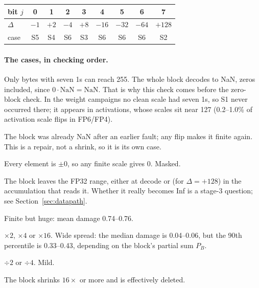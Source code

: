 \documentclass[10pt,a4paper]{article}
\begin{document}
\begin{center}
\begin{tabular}{lcccccccc}
\toprule
bit $j$ & 0 & 1 & 2 & 3 & 4 & 5 & 6 & 7 \\
\midrule
$\Delta$ & $-1$ & $+2$ & $-4$ & $+8$ & $-16$ & $-32$ & $-64$ & $+128$ \\
case & S5 & S4 & S6 & S3 & S6 & S6 & S6 & S2 \\
\bottomrule
\end{tabular}
\end{center}

\paragraph{The cases, in checking order.}
\begin{description}[leftmargin=1.2em,style=nextline]
  \item[S1 to NaN ($X'=255$).] Only bytes with seven 1s can reach 255. The whole block decodes to
        NaN, zeros included, since $0\cdot\text{NaN}=\text{NaN}$. That is why this check comes
        before the zero-block check. In the weight campaigns no clean scale had seven 1s, so S1
        never occurred there; it appears in activations, whose scales sit near 127 (0.2--1.0\% of
        activation scale flips in FP6/FP4).
  \item[S7 from NaN ($X=255$).] The block was already NaN after an earlier fault; any flip
        makes it finite again. This is a repair, not a shrink, so it is its own case.
  \item[S0 zero block.] Every element is $\pm 0$, so any finite scale gives 0. Masked.
  \item[S2 overflow.] The block leaves the FP32 range, either at decode or (for $\Delta=+128$) in
        the accumulation that reads it. Whether it really becomes Inf is a stage-3 question; see
        Section~\ref{sec:datapath}.
  \item[S3 grow $\times256$ or more ($\Delta\ge 8$).] Finite but huge: mean damage 0.74--0.76.
  \item[S4 grow ($0<\Delta<8$).] $\times2$, $\times4$ or $\times16$. Wide spread: the median
        damage is 0.04--0.06, but the 90th percentile is 0.33--0.43, depending on the block's
        partial sum $P_B$.
  \item[S5 shrink ($-2\le\Delta<0$).] $\div2$ or $\div4$. Mild.
  \item[S6 erase ($\Delta\le -3$).] The block shrinks $16\times$ or more and is effectively deleted.
\end{description}
\end{document}
